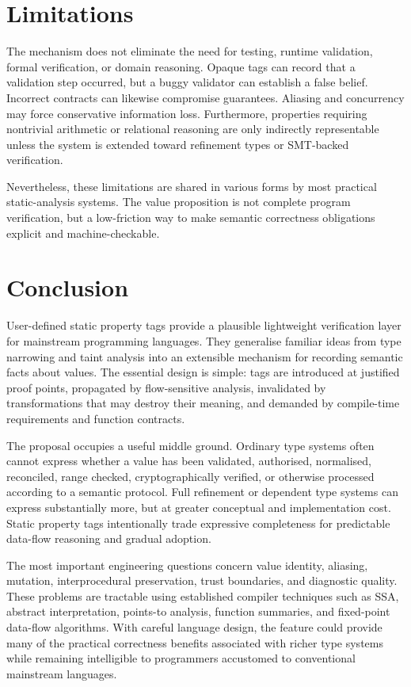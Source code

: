 \documentclass[11pt]{article}
\begin{document}
\section{Limitations}
The mechanism does not eliminate the need for testing, runtime validation, formal verification, or domain reasoning. Opaque tags can record that a validation step occurred, but a buggy validator can establish a false belief. Incorrect contracts can likewise compromise guarantees. Aliasing and concurrency may force conservative information loss. Furthermore, properties requiring nontrivial arithmetic or relational reasoning are only indirectly representable unless the system is extended toward refinement types or SMT-backed verification.

Nevertheless, these limitations are shared in various forms by most practical static-analysis systems. The value proposition is not complete program verification, but a low-friction way to make semantic correctness obligations explicit and machine-checkable.

\section{Conclusion}
User-defined static property tags provide a plausible lightweight verification layer for mainstream programming languages. They generalise familiar ideas from type narrowing and taint analysis into an extensible mechanism for recording semantic facts about values. The essential design is simple: tags are introduced at justified proof points, propagated by flow-sensitive analysis, invalidated by transformations that may destroy their meaning, and demanded by compile-time requirements and function contracts.

The proposal occupies a useful middle ground. Ordinary type systems often cannot express whether a value has been validated, authorised, normalised, reconciled, range checked, cryptographically verified, or otherwise processed according to a semantic protocol. Full refinement or dependent type systems can express substantially more, but at greater conceptual and implementation cost. Static property tags intentionally trade expressive completeness for predictable data-flow reasoning and gradual adoption.

The most important engineering questions concern value identity, aliasing, mutation, interprocedural preservation, trust boundaries, and diagnostic quality. These problems are tractable using established compiler techniques such as SSA, abstract interpretation, points-to analysis, function summaries, and fixed-point data-flow algorithms. With careful language design, the feature could provide many of the practical correctness benefits associated with richer type systems while remaining intelligible to programmers accustomed to conventional mainstream languages.
\end{document}
